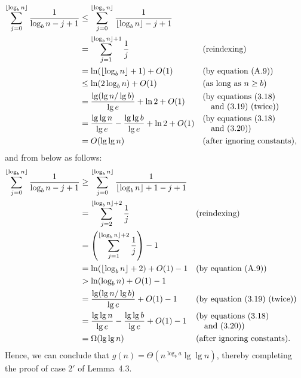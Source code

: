 \begin{align*}
    \sum_{j=0}^{\lfloor\log_bn\rfloor}\frac{1}{\log_bn-j+1} &\le \sum_{j=0}^{\lfloor\log_bn\rfloor}\frac{1}{\lfloor\log_bn\rfloor-j+1} \\
    &= \sum_{j=1}^{\lfloor\log_bn\rfloor+1}\frac{1}{j} && \text{(reindexing)} \\
    &= \ln(\lfloor\log_bn\rfloor+1)+O(1) && \text{(by equation (A.9))} \\
    &\le \ln(2\log_bn)+O(1) && \text{(as long as $n\ge b$)} \\
    &= \frac{\lg(\lg n/\lg b)}{\lg e}+\ln2+O(1) && \begin{minipage}{1.5in}(by equations (3.18)\\\null\quad and (3.19) (twice))\end{minipage} \\
    &= \frac{\lg\lg n}{\lg e}-\frac{\lg\lg b}{\lg e}+\ln2+O(1) && \begin{minipage}{1.5in}(by equations (3.18)\\\null\quad and (3.20))\end{minipage} \\
    &= O(\lg\lg n) && \text{(after ignoring constants)},
\end{align*}
and from below as follows:
\begin{align*}
    \sum_{j=0}^{\lfloor\log_bn\rfloor}\frac{1}{\log_bn-j+1} &\ge \sum_{j=0}^{\lfloor\log_bn\rfloor}\frac{1}{\lfloor\log_bn\rfloor+1-j+1} \\
    &= \sum_{j=2}^{\lfloor\log_bn\rfloor+2}\frac{1}{j} && \text{(reindexing)} \\
    &= \left(\sum_{j=1}^{\lfloor\log_bn\rfloor+2}\frac{1}{j}\right)-1 \\
    &= \ln(\lfloor\log_bn\rfloor+2)+O(1)-1 && \text{(by equation (A.9))} \\
    &> \ln(\log_bn)+O(1)-1 \\
    &= \frac{\lg(\lg n/\lg b)}{\lg e}+O(1)-1 && \text{(by equation (3.19) (twice))} \\
    &= \frac{\lg\lg n}{\lg e}-\frac{\lg\lg b}{\lg e}+O(1)-1 && \begin{minipage}{1.5in}(by equations (3.18)\\\null\quad and (3.20))\end{minipage} \\
    &= \Omega(\lg\lg n) && \text{(after ignoring constants)}.
\end{align*}
Hence, we can conclude that $g(n)=\Theta(n^{\log_ba}\lg\lg n)$, thereby completing the proof of case 2$'$ of Lemma~4.3.

